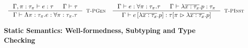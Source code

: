 \begin{figure}[ht!]

\medskip {}
$$\begin{array}{cc}
\inference
    {\hastype{\Gamma, \rvar:\tau_\rvar}{e}{\tau} &&
     \isWellFormed{\Gamma}{\tau} 
    }
    {\hastype{\Gamma}{\epabs{\rvar}{\tau_\rvar}{e}}{\tpabs{\rvar}{\tau_\rvar}{\tau}}}
    [\tpgen]
&  

\inference
    {\hastype{\Gamma}{e}{\tpabs{\rvar}{\tau_\rvar}{\tau}} && 
     \hastype{\Gamma}{\efunbar{x:\tau_x}{p}}{\tau_\rvar}
    }
    {\hastype{\Gamma}
             {\epapp{e}{\efunbar{x:\tau_x}{p}}}
             {\rpinst{\tau}{\rvar}{\efunbar{x:\tau_x}{p}}}
    }
    [\tpinst]
\end{array}$$
\caption{\textbf{Static Semantics: Well-formedness, Subtyping and Type Checking}}
\label{fig:rules}
\end{figure}
